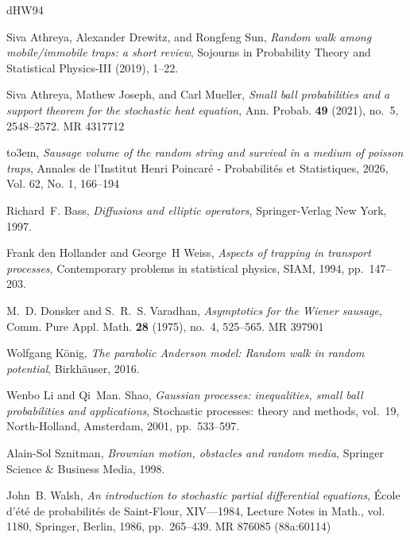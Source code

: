 \documentclass[12pt]{amsart}
\numberwithin{equation}{section}
\theoremstyle{definition}
\numberwithin{equation}{section}
\begin{document}
\providecommand{\bysame}{\leavevmode\hbox to3em{\hrulefill}\thinspace}
\providecommand{\MR}{\relax\ifhmode\unskip\space\fi MR }
\providecommand{\MRhref}[2]{%
  \href{http://www.ams.org/mathscinet-getitem?mr=#1}{#2}
}
\providecommand{\href}[2]{#2}
\begin{thebibliography}{dHW94}

Siva Athreya, Alexander Drewitz, and Rongfeng Sun, \emph{Random walk among
  mobile/immobile traps: a short review}, Sojourns in Probability Theory and
  Statistical Physics-III (2019), 1--22.

Siva Athreya, Mathew Joseph, and Carl Mueller, \emph{Small ball probabilities
  and a support theorem for the stochastic heat equation}, Ann. Probab.
  \textbf{49} (2021), no.~5, 2548--2572. \MR{4317712}

\bysame, \emph{Sausage volume of the random string and survival in a medium of
  poisson traps}, Annales de l'Institut Henri Poincar\'e - Probabilit\'es et Statistiques, 2026, Vol. 62, No. 1, 166–194

Richard~F. Bass, \emph{Diffusions and elliptic operators}, Springer-Verlag New
  York, 1997.

Frank den Hollander and George~H Weiss, \emph{Aspects of trapping in transport
  processes}, Contemporary problems in statistical physics, SIAM, 1994,
  pp.~147--203.

M.~D. Donsker and S.~R.~S. Varadhan, \emph{Asymptotics for the {W}iener
  sausage}, Comm. Pure Appl. Math. \textbf{28} (1975), no.~4, 525--565.
  \MR{397901}

Wolfgang K{\"o}nig, \emph{The parabolic {A}nderson model: Random walk in random
  potential}, Birkh{\"a}user, 2016.

Wenbo Li and Qi~Man. Shao, \emph{Gaussian processes: inequalities, small ball
  probabilities and applications}, Stochastic processes: theory and methods,
  vol.~19, North-Holland, Amsterdam, 2001, pp.~533--597.

Alain-Sol Sznitman, \emph{Brownian motion, obstacles and random media},
  Springer Science \& Business Media, 1998.

John~B. Walsh, \emph{An introduction to stochastic partial differential
  equations}, \'{E}cole d'\'et\'e de probabilit\'es de {S}aint-{F}lour,
  {XIV}---1984, Lecture Notes in Math., vol. 1180, Springer, Berlin, 1986,
  pp.~265--439. \MR{876085 (88a:60114)}

\end{thebibliography}
  
\end{document}
